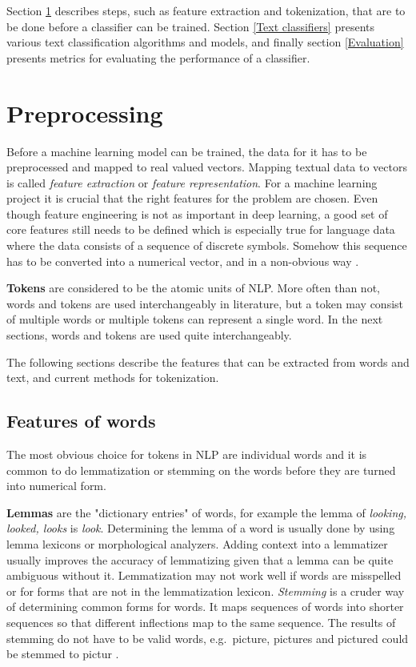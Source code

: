Section \ref{Preprocessing} describes steps, such as feature extraction and tokenization, that are to be done before a classifier can be trained.
Section \ref{Text classifiers} presents various text classification algorithms and models, and finally section \ref{Evaluation} presents metrics for evaluating the performance of a classifier.

\section{Preprocessing}\label{Preprocessing}
Before a machine learning model can be trained, the data for it has to be preprocessed and mapped to real valued vectors.
Mapping textual data to vectors is called \textit{feature extraction} or \textit{feature representation}.
For a machine learning project it is crucial that the right features for the problem are chosen.
Even though feature engineering is not as important in deep learning, a good set of core features still needs to be defined which is especially true for language data where the data consists of a sequence of discrete symbols.
Somehow this sequence has to be converted into a numerical vector, and in a non-obvious way \cite{goldberg2017}.

\textbf{Tokens} are considered to be the atomic units of NLP.
More often than not, words and tokens are used interchangeably in literature, but a token may consist of multiple words or multiple tokens can represent a single word.
In the next sections, words and tokens are used quite interchangeably.

The following sections describe the features that can be extracted from words and text, and current methods for tokenization.

\subsection{Features of words}\label{Features of words}
The most obvious choice for tokens in NLP are individual words and it is common to do lemmatization or stemming on the words before they are turned into numerical form.

\textbf{Lemmas} are the "dictionary entries" of words, for example the lemma of \textit{looking, looked, looks} is \textit{look}.
Determining the lemma of a word is usually done by using lemma lexicons or morphological analyzers.
Adding context into a lemmatizer usually improves the accuracy of lemmatizing given that a lemma can be quite ambiguous without it.
Lemmatization may not work well if words are misspelled or for forms that are not in the lemmatization lexicon.
\textit{Stemming} is a cruder way of determining common forms for words.
It maps sequences of words into shorter sequences so that different inflections map to the same sequence.
The results of stemming do not have to be valid words, e.g.\ picture, pictures and pictured could be stemmed to pictur \cite{goldberg2017}.

